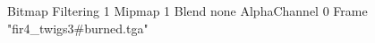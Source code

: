 {Bitmap
	{Filtering 1}
	{Mipmap 1}
	{Blend none}
	{AlphaChannel 0}
	{Frame "fir4_twigs3#burned.tga"}
}
